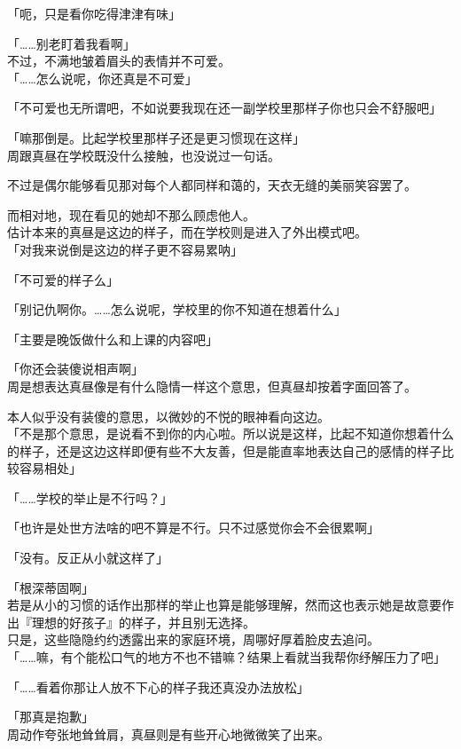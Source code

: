 「呃，只是看你吃得津津有味」

「……别老盯着我看啊」\\

不过，不满地皱着眉头的表情并不可爱。\\

「……怎么说呢，你还真是不可爱」

「不可爱也无所谓吧，不如说要我现在还一副学校里那样子你也只会不舒服吧」

「嘛那倒是。比起学校里那样子还是更习惯现在这样」\\

周跟真昼在学校既没什么接触，也没说过一句话。

不过是偶尔能够看见那对每个人都同样和蔼的，天衣无缝的美丽笑容罢了。

而相对地，现在看见的她却不那么顾虑他人。\\

估计本来的真昼是这边的样子，而在学校则是进入了外出模式吧。\\

「对我来说倒是这边的样子更不容易累呐」

「不可爱的样子么」

「别记仇啊你。……怎么说呢，学校里的你不知道在想着什么」

「主要是晚饭做什么和上课的内容吧」

「你还会装傻说相声啊」\\

周是想表达真昼像是有什么隐情一样这个意思，但真昼却按着字面回答了。

本人似乎没有装傻的意思，以微妙的不悦的眼神看向这边。\\

「不是那个意思，是说看不到你的内心啦。所以说是这样，比起不知道你想着什么的样子，还是这边这样即便有些不大友善，但是能直率地表达自己的感情的样子比较容易相处」

「……学校的举止是不行吗？」

「也许是处世方法啥的吧不算是不行。只不过感觉你会不会很累啊」

「没有。反正从小就这样了」

「根深蒂固啊」\\

若是从小的习惯的话作出那样的举止也算是能够理解，然而这也表示她是故意要作出『理想的好孩子』的样子，并且别无选择。\\

只是，这些隐隐约约透露出来的家庭环境，周哪好厚着脸皮去追问。\\

「……嘛，有个能松口气的地方不也不错嘛？结果上看就当我帮你纾解压力了吧」

「……看着你那让人放不下心的样子我还真没办法放松」

「那真是抱歉」\\

周动作夸张地耸耸肩，真昼则是有些开心地微微笑了出来。
